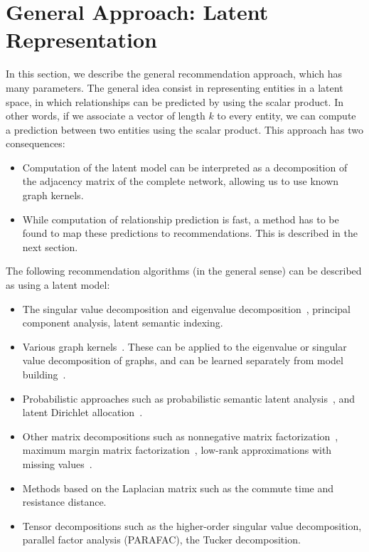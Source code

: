 \documentclass{article}
\begin{document}
\section{General Approach:  Latent Representation}
In this section, we describe the general recommendation approach, which
has many parameters.  
The general idea consist in representing entities in a latent space, in
which relationships can be predicted by using the scalar product.  In
other words, if we associate a vector of length $k$ to every entity, we
can compute a prediction between two entities using the scalar product.
This approach has two consequences:
\begin{itemize}
\item Computation of the latent model can be interpreted as a
  decomposition of the adjacency matrix of the complete network,
  allowing us to use known graph kernels.
\item While computation of relationship prediction is fast, a method has
  to be found to map these predictions to recommendations.  This is
  described in the next section. 
\end{itemize}

The following recommendation algorithms (in the general sense) can be
described as using a latent model:
\begin{itemize}
\item The singular value decomposition and eigenvalue decomposition~\cite{b179},
  principal component analysis, latent semantic indexing. 
\item Various graph kernels~\cite{b263,b289,b306,b413}.
  These can be applied to the eigenvalue or singular value decomposition
  of graphs, and can be learned separately from model
  building~\cite{kunegis:spectral-transformation}.  
\item Probabilistic approaches such as probabilistic semantic latent
  analysis~\cite{b347,b31,b34}, and latent Dirichlet allocation~\cite{b358}.
\item Other matrix decompositions such as nonnegative matrix
  factorization~\cite{b393}, maximum margin matrix factorization~\cite{b197}, low-rank
  approximations with missing values~\cite{b178}. 
\item Methods based on the Laplacian matrix such as the commute time and
  resistance distance.
\item Tensor decompositions such as the higher-order singular value
  decomposition, parallel factor analysis (PARAFAC), the Tucker
  decomposition. 
\end{itemize}
\end{document}
